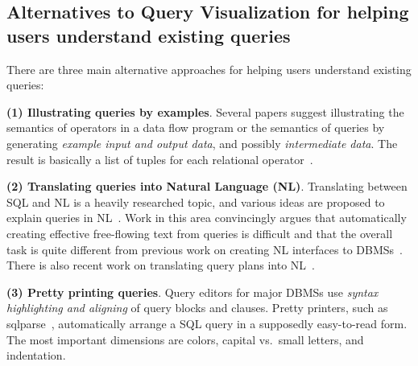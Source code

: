 \documentclass[letterpaper,11pt]{article}
\begin{document}
\subsection{Alternatives to Query Visualization for helping users understand existing queries} 
\label{section:alternatives}

There are three main alternative approaches for helping users understand existing queries:


\textbf{(1) Illustrating queries by examples}. 
Several papers suggest illustrating the semantics of operators in a data flow program or the semantics of queries by generating 
\emph{example input and output data}, and possibly \emph{intermediate data}.
The result is basically a list of tuples for each relational operator~\cite{DBLP:conf/uist/AbouziedHS12,
DBLP:journals/vldb/ChandraCKRS015,
GrustKRS2011:SQLdebugging,
DBLP:journals/tods/GrustR13,
DBLP:journals/pvldb/KhanX0H17,
MRJ:ExplainingWrongQueries:2019,
DBLP:conf/sigmod/OlstonCS09}.
%










\textbf{(2) Translating queries into Natural Language (NL)}.
Translating between SQL and NL is a heavily researched topic, and various ideas are proposed to explain queries in NL~\cite{DBLP:conf/inlg/GehrmannDER18,
DBLP:conf/nldb/Ioannidis08, 
DBLP:conf/icde/KoutrikaSI10,
DBLP:conf/cidr/SimitsisI09, 
DBLP:conf/emnlp/XuWWFS18}. 
Work in this area convincingly argues that automatically creating effective free-flowing text from queries is difficult and that the overall task is quite different from previous work on creating NL interfaces to DBMSs~\cite{Jarke:NL:1985}.
There is also recent work on translating query plans into NL~\cite{DBLP:conf/sigmod/WangBLJLC21}.





\textbf{(3) Pretty printing queries}.
Query editors for major DBMSs use 
\emph{syntax highlighting
and aligning} 
%
of query blocks and clauses. 
Pretty printers, such as sqlparse~\cite{sqlparse}, automatically arrange a SQL query in a supposedly easy-to-read form.
The most important dimensions are colors, capital vs.\ small letters, and indentation.



%
%
%
%
%
%
%
%
%
%
%
%
%
%



\end{document}
